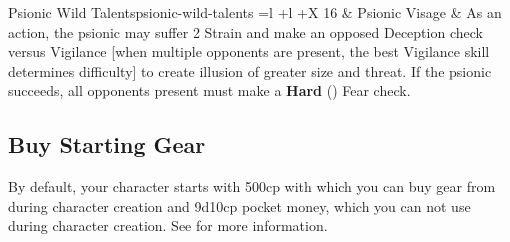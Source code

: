 \begin{multicols}{2}
\begin{table*}[!htb]
\begin{GenesysTable}{Psionic Wild Talents}{psionic-wild-talents}{ =l +l +X}
16  & Psionic Visage      & As an action, the psionic may suffer 2 Strain and make an opposed Deception check versus Vigilance
                            [when multiple opponents are present, the best Vigilance skill determines difficulty] to
                            create illusion of greater size and threat. If the psionic succeeds, all opponents present must
                            make a \textbf{Hard} (\difficulty\difficulty\difficulty) Fear check.\\
\end{GenesysTable}
\end{table*}

\subsection{Buy Starting Gear}
By default, your character starts with 500cp with which you can buy gear from during character creation and 9d10cp pocket money, which you can not use during character creation.
See  for more information.

\end{multicols}
